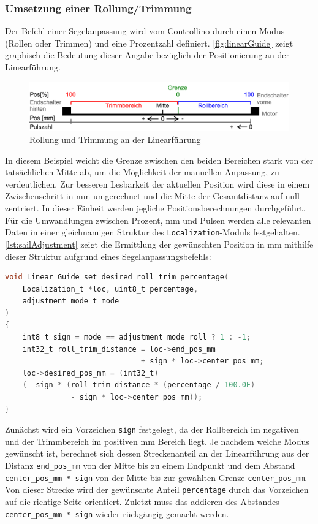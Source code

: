\subsubsection{Umsetzung einer Rollung/Trimmung}
Der Befehl einer Segelanpassung wird vom Controllino durch einen Modus (Rollen oder Trimmen) und eine Prozentzahl definiert. \autoref{fig:linearGuide} zeigt graphisch die Bedeutung dieser Angabe bezüglich der Positionierung an der Linearführung.
\begin{figure}[H]
	\centering
	\includegraphics[width=\linewidth]{images/Software/LinearGuide.png}
	\caption{Rollung und Trimmung an der Linearführung}
	\label{fig:linearGuide}
\end{figure}
\noindent
In diesem Beispiel weicht die Grenze zwischen den beiden Bereichen stark von der tatsächlichen Mitte ab, um die Möglichkeit der manuellen Anpassung, zu verdeutlichen. Zur besseren Lesbarkeit der aktuellen Position wird diese in einem Zwischenschritt in mm umgerechnet und die Mitte der Gesamtdistanz auf null zentriert. In dieser Einheit werden jegliche Positionsberechnungen durchgeführt. \\

\noindent
Für die Umwandlungen zwischen Prozent, mm und Pulsen werden alle relevanten Daten in einer gleichnamigen Struktur des \verb|Localization|-Moduls festgehalten. \autoref{lst:sailAdjustment} zeigt die Ermittlung der gewünschten Position in mm mithilfe dieser Struktur aufgrund eines Segelanpassungsbefehls:
\begin{lstlisting}[language=C, caption={Berechnung der Zielposition}, label={lst:sailAdjustment}]
void Linear_Guide_set_desired_roll_trim_percentage(
	Localization_t *loc, uint8_t percentage, 
	adjustment_mode_t mode
)
{
	int8_t sign = mode == adjustment_mode_roll ? 1 : -1;
	int32_t roll_trim_distance = loc->end_pos_mm
	                           + sign * loc->center_pos_mm;
	loc->desired_pos_mm = (int32_t) 
	(- sign * (roll_trim_distance * (percentage / 100.0F)
	           - sign * loc->center_pos_mm));
}
\end{lstlisting}
Zunächst wird ein Vorzeichen \verb|sign| festgelegt, da der Rollbereich im negativen und der Trimmbereich im positiven mm Bereich liegt. Je nachdem welche Modus gewünscht ist, berechnet sich dessen Streckenanteil an der Linearführung aus der Distanz \verb|end_pos_mm| von der Mitte bis zu einem Endpunkt und dem Abstand \verb|center_pos_mm * sign| von der Mitte bis zur gewählten Grenze \verb|center_pos_mm|. Von dieser Strecke wird der gewünschte Anteil \verb|percentage| durch das Vorzeichen auf die richtige Seite orientiert. Zuletzt muss das addieren des Abstandes \verb|center_pos_mm * sign| wieder rückgängig gemacht werden.\\

